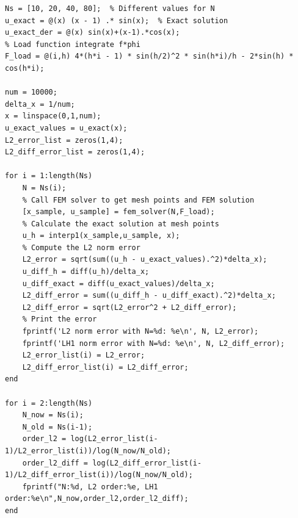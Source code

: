 \documentclass[11pt]{ctexart}
\begin{document}
\begin{lstlisting}[caption={Main Code}]
% Main script: Call FEM solver and plot results for different N values
Ns = [10, 20, 40, 80];  % Different values for N
u_exact = @(x) (x - 1) .* sin(x);  % Exact solution
u_exact_der = @(x) sin(x)+(x-1).*cos(x);
% Load function integrate f*phi
F_load = @(i,h) 4*(h*i - 1) * sin(h/2)^2 * sin(h*i)/h - 2*sin(h) * cos(h*i); 
				
num = 10000;
delta_x = 1/num;
x = linspace(0,1,num);
u_exact_values = u_exact(x);
L2_error_list = zeros(1,4);
L2_diff_error_list = zeros(1,4);

for i = 1:length(Ns)
    N = Ns(i);   
    % Call FEM solver to get mesh points and FEM solution
    [x_sample, u_sample] = fem_solver(N,F_load);
    % Calculate the exact solution at mesh points
    u_h = interp1(x_sample,u_sample, x);
    % Compute the L2 norm error
    L2_error = sqrt(sum((u_h - u_exact_values).^2)*delta_x);
    u_diff_h = diff(u_h)/delta_x;
    u_diff_exact = diff(u_exact_values)/delta_x;
    L2_diff_error = sum((u_diff_h - u_diff_exact).^2)*delta_x;
    L2_diff_error = sqrt(L2_error^2 + L2_diff_error);    
    % Print the error
	fprintf('L2 norm error with N=%d: %e\n', N, L2_error);
	fprintf('LH1 norm error with N=%d: %e\n', N, L2_diff_error);
	L2_error_list(i) = L2_error;
	L2_diff_error_list(i) = L2_diff_error;
end

for i = 2:length(Ns)
    N_now = Ns(i);
    N_old = Ns(i-1);
    order_l2 = log(L2_error_list(i-1)/L2_error_list(i))/log(N_now/N_old);
    order_l2_diff = log(L2_diff_error_list(i-1)/L2_diff_error_list(i))/log(N_now/N_old);
    fprintf("N:%d, L2 order:%e, LH1 order:%e\n",N_now,order_l2,order_l2_diff);
end
\end{lstlisting}
\end{document}
